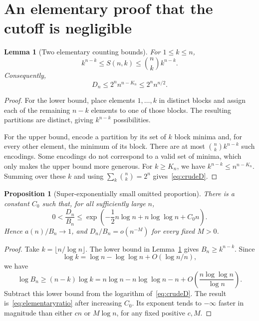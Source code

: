 \documentclass[11pt,a4paper]{article}
\numberwithin{equation}{section}
\newtheorem{lemma}[theorem]{Lemma}
\newtheorem{proposition}[theorem]{Proposition}
\theoremstyle{remark}
\begin{document}
\section{An elementary proof that the cutoff is negligible}

\begin{lemma}[Two elementary counting bounds]\label{lem:counting}
For $1\le k\le n$,
\begin{equation}\label{eq:countbounds}
 k^{n-k}\le S(n,k)\le\binom nk k^{n-k}.
\end{equation}
Consequently,
\begin{equation}\label{eq:crudeD}
 D_n\le 2^n n^{n-K_n}\le 2^n n^{n/2}.
\end{equation}
\end{lemma}
\begin{proof}
For the lower bound, place elements $1,\ldots,k$ in distinct blocks and
assign each of the remaining $n-k$ elements to one of those blocks. The
resulting partitions are distinct, giving $k^{n-k}$ possibilities.

For the upper bound, encode a partition by its set of $k$ block minima and,
for every other element, the minimum of its block. There are at most
$\binom nk k^{n-k}$ such encodings. Some encodings do not correspond to a
valid set of minima, which only makes the upper bound more generous.
For $k\ge K_n$, we have $k^{n-k}\le n^{n-K_n}$. Summing over these $k$ and
using $\sum_k\binom nk=2^n$ gives~\eqref{eq:crudeD}.
\end{proof}

\begin{proposition}[Super-exponentially small omitted proportion]
\label{prop:negligible}
There is a constant $C_0$ such that, for all sufficiently large $n$,
\begin{equation}\label{eq:elementaryratio}
 0<\frac{D_n}{B_n}
 \le\exp\!\left(-\frac12n\log n+n\log\log n+C_0n\right).
\end{equation}
Hence $a(n)/B_n\to1$, and $D_n/B_n=o(n^{-M})$ for every fixed $M>0$.
\end{proposition}
\begin{proof}
Take $k=\lfloor n/\log n\rfloor$. The lower bound in
Lemma~\ref{lem:counting} gives $B_n\ge k^{n-k}$. Since
\[
 \log k=\log n-\log\log n+O(\log n/n),
\]
we have
\begin{equation}\label{eq:lowerlog}
 \log B_n\ge (n-k)\log k
 =n\log n-n\log\log n-n
   +O\!\left(\frac{n\log\log n}{\log n}\right).
\end{equation}
Subtract this lower bound from the logarithm of~\eqref{eq:crudeD}.
The result is~\eqref{eq:elementaryratio} after increasing $C_0$.
Its exponent tends to $-\infty$ faster in magnitude than either $cn$ or
$M\log n$, for any fixed positive $c,M$.
\end{proof}
\end{document}
